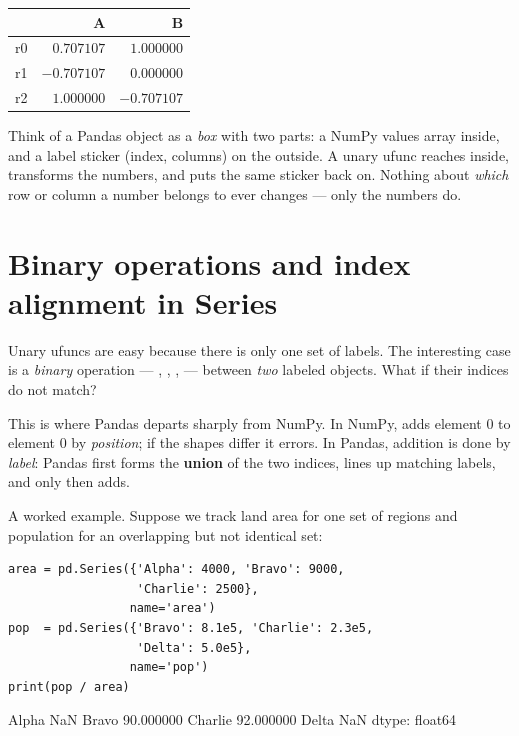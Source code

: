 \documentclass[11pt]{article}
\begin{document}
\begin{outbox}
\begin{tabular}{l r r}
\toprule
 & \textbf{A} & \textbf{B} \\
\midrule
r0 & $0.707107$ & $1.000000$ \\
r1 & $-0.707107$ & $0.000000$ \\
r2 & $1.000000$ & $-0.707107$ \\
\bottomrule
\end{tabular}
\end{outbox}

\begin{intuition}
Think of a Pandas object as a \emph{box} with two parts: a NumPy values array inside, and a label sticker (index, columns) on the outside. A unary ufunc reaches inside, transforms the numbers, and puts the same sticker back on. Nothing about \emph{which} row or column a number belongs to ever changes --- only the numbers do.
\end{intuition}

\section{Binary operations and index alignment in Series}

Unary ufuncs are easy because there is only one set of labels. The interesting case is a \emph{binary} operation --- \code{+}, \code{-}, \code{*}, \code{/} --- between \emph{two} labeled objects. What if their indices do not match?

This is where Pandas departs sharply from NumPy. In NumPy,  adds element 0 to element 0 by \emph{position}; if the shapes differ it errors. In Pandas, addition is done by \emph{label}: Pandas first forms the \textbf{union} of the two indices, lines up matching labels, and only then adds.

A worked example. Suppose we track land area for one set of regions and population for an overlapping but not identical set:

\begin{lstlisting}
area = pd.Series({'Alpha': 4000, 'Bravo': 9000,
                  'Charlie': 2500},
                 name='area')
pop  = pd.Series({'Bravo': 8.1e5, 'Charlie': 2.3e5,
                  'Delta': 5.0e5},
                 name='pop')
print(pop / area)
\end{lstlisting}

\begin{outblock}
Alpha           NaN
Bravo      90.000000
Charlie    92.000000
Delta           NaN
dtype: float64
\end{outblock}
\end{document}
